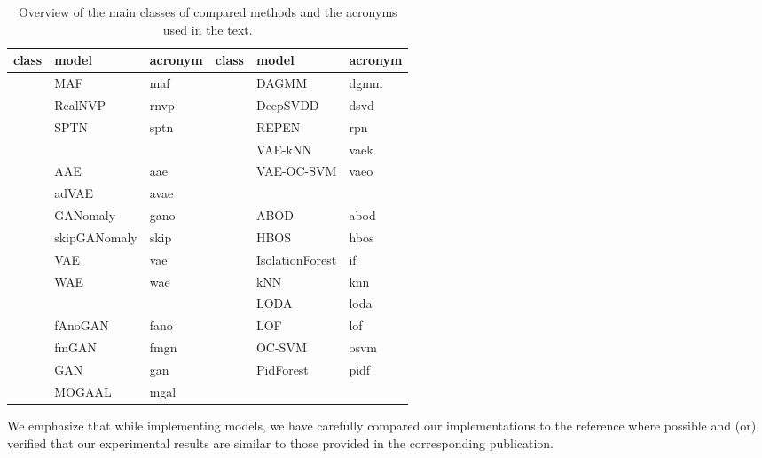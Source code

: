 \begin{table}
    \centering
    \tabcolsep=0.1cm
    
    \begin{tabular}{cll|cll}
    \toprule
    \textbf{class} & \textbf{model} & \textbf{acronym} & \textbf{class} & \textbf{model} & \textbf{acronym}  \\\midrule
    
    \parbox[t]{2mm}{} & MAF & maf & \parbox[t]{2mm}{} & DAGMM & dgmm \\
        & RealNVP & rnvp & & DeepSVDD & dsvd \\
        & SPTN & sptn & & REPEN & rpn  \\
        & & & & VAE-kNN & vaek \\

    \parbox[t]{2mm}{} 
        & AAE & aae & & VAE-OC-SVM & vaeo \\
        & adVAE & avae & & & \\

        & GANomaly & gano & \parbox[t]{2mm}{} & ABOD & abod \\

        & skipGANomaly & skip & & HBOS & hbos \\
        & VAE & vae & & IsolationForest & if \\
        & WAE & wae & & kNN & knn \\
        & & & & LODA & loda \\
    \parbox[t]{2mm}{}
        & fAnoGAN & fano & & LOF & lof \\ 
        & fmGAN & fmgn & & OC-SVM & osvm \\
        & GAN & gan & & PidForest & pidf \\
        & MOGAAL & mgal & \\
    
    \bottomrule
    \end{tabular}

    \vspace*{0.15cm}
    \caption{Overview of the main classes of compared methods and the acronyms used in the text.}
    \label{tab:model_acronyms_2col}
\end{table}

We emphasize that while implementing models, we have carefully compared our implementations to the reference where possible and (or) verified that our experimental results are similar to those provided in the corresponding publication.

